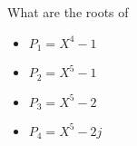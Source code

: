 \bexo 
What are the roots of 
\begin{itemize}
	\item $P_1=X^4-1$
	\item $P_2=X^5-1$
	\item $P_3=X^5-2$
	\item $P_4=X^5-2j$
\end{itemize}

\eexo

\solution{

}
